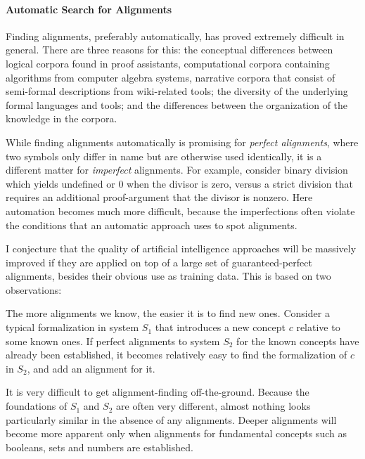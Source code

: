 
\paragraph{Automatic Search for Alignments}
Finding alignments, preferably automatically, has proved extremely difficult in 
general. There are three reasons for this:
the conceptual differences between logical corpora found in proof assistants, 
computational corpora containing algorithms from computer algebra systems, 
narrative corpora that consist of semi-formal descriptions from wiki-related 
tools; the diversity of the underlying formal languages and tools;
and the differences between the organization of the knowledge in the corpora.

While finding alignments automatically is promising for \emph{perfect alignments}, where two symbols only differ in name but are otherwise used identically, it is a different matter for \emph{imperfect} alignments.
For example, consider binary division which yields \textsf{undefined} or \textsf{0} when the divisor is zero, versus a strict division that requires an additional proof-argument that the divisor is nonzero. %
Here automation becomes much more difficult, because the imperfections often violate the conditions that an automatic approach uses to spot alignments.

I conjecture that the quality of artificial intelligence approaches will be massively improved if they are applied on top of a large set of guaranteed-perfect alignments, besides their obvious use as training data.
This is based on two observations:
\begin{compactitem}
 \item The more alignments we know, the easier it is to find new ones.
Consider a typical formalization in system $S_1$ that introduces a new concept $c$ relative to some known ones.
If perfect alignments to system $S_2$ for the known concepts have already been established, it becomes relatively easy to find the formalization of $c$ in $S_2$, and add an alignment for it.
\item It is very difficult to get alignment-finding off-the-ground.
Because the foundations of $S_1$ and $S_2$ are often very different, almost nothing looks particularly similar in the absence of any alignments.
Deeper alignments will become more apparent only when alignments for fundamental concepts such as booleans, sets and numbers are established.
\end{compactitem}

